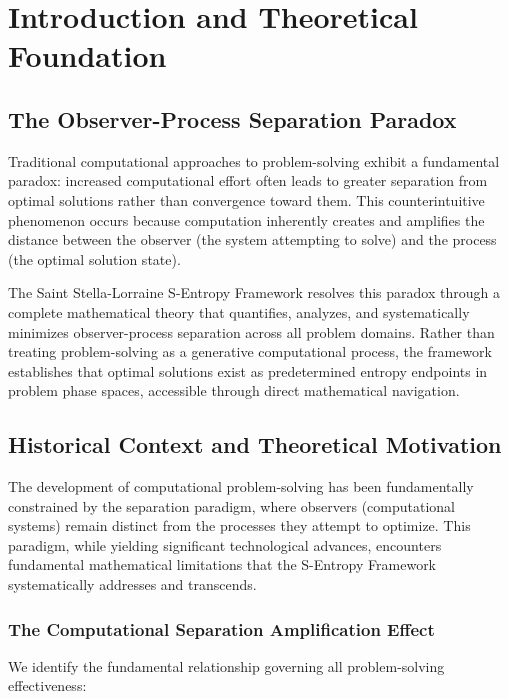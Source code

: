 \documentclass[11pt]{article}
\theoremstyle{definition}
\theoremstyle{remark}
\begin{document}
\tableofcontents
\newpage

\section{Introduction and Theoretical Foundation}

\subsection{The Observer-Process Separation Paradox}

Traditional computational approaches to problem-solving exhibit a fundamental paradox: increased computational effort often leads to greater separation from optimal solutions rather than convergence toward them. This counterintuitive phenomenon occurs because computation inherently creates and amplifies the distance between the observer (the system attempting to solve) and the process (the optimal solution state).

The Saint Stella-Lorraine S-Entropy Framework resolves this paradox through a complete mathematical theory that quantifies, analyzes, and systematically minimizes observer-process separation across all problem domains. Rather than treating problem-solving as a generative computational process, the framework establishes that optimal solutions exist as predetermined entropy endpoints in problem phase spaces, accessible through direct mathematical navigation.

\subsection{Historical Context and Theoretical Motivation}

The development of computational problem-solving has been fundamentally constrained by the separation paradigm, where observers (computational systems) remain distinct from the processes they attempt to optimize. This paradigm, while yielding significant technological advances, encounters fundamental mathematical limitations that the S-Entropy Framework systematically addresses and transcends.

\subsubsection{The Computational Separation Amplification Effect}

We identify the fundamental relationship governing all problem-solving effectiveness:
\end{document}
